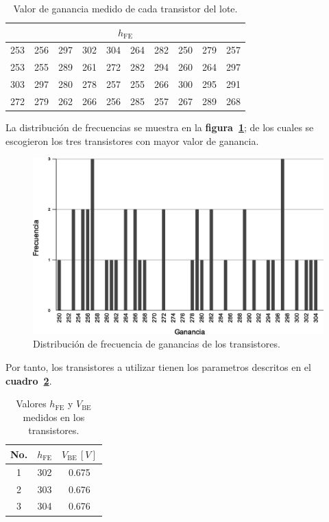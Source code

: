 \begin{table}[!ht]
\begin{center}
    \begin{tabular}{|c|c|c|c|c|c|c|c|c|c|}
    \hline
    \multicolumn{10}{|c|}{\textbf{$h_{\text{FE}}$}}
    \tabularnewline \hline \hline
    253 & 256 & 297 & 302 & 304 & 264 & 282 & 250 & 279 & 257
    \tabularnewline \hline
    253 & 255 & 289 & 261 & 272 & 282 & 294 & 260 & 264 & 297
    \tabularnewline \hline
    303 & 297 & 280 & 278 & 257 & 255 & 266 & 300 & 295 & 291
    \tabularnewline \hline
    272 & 279 & 262 & 266 & 256 & 285 & 257 & 267 & 289 & 268
    \tabularnewline \hline
    \end{tabular}
\end{center}
\caption{Valor de ganancia medido de cada transistor del lote.}
\label{cuadro02}
\end{table}

La distribución de frecuencias se muestra en la \textbf{figura~\ref{figura05}};
de los cuales se escogieron los tres transistores con mayor valor de ganancia.

\begin{figure}[!ht]
\centering
\includegraphics[scale=0.5]{diagramas/figura05.eps}
\caption{Distribución de frecuencia de ganancias de los transistores.}
\label{figura05}
\end{figure}

Por tanto, los transistores a utilizar tienen los parametros descritos en el
\textbf{cuadro~\ref{cuadro03}}.

\begin{table}[!ht]
\begin{center}
    \begin{tabular}{|c||c|c|}
    \hline
    No. & $h_{\text{FE}}$ & $V_{\text{BE}}\,[V]$
    \tabularnewline \hline \hline
    1 & 302 & 0.675
    \tabularnewline \hline
    2 & 303 & 0.676
    \tabularnewline \hline
    3 & 304 & 0.676
    \tabularnewline \hline
    \end{tabular}
\end{center}
\caption{Valores $h_{\text{FE}}$ y $V_{\text{BE}}$ medidos en los transistores.}
\label{cuadro03}
\end{table}

